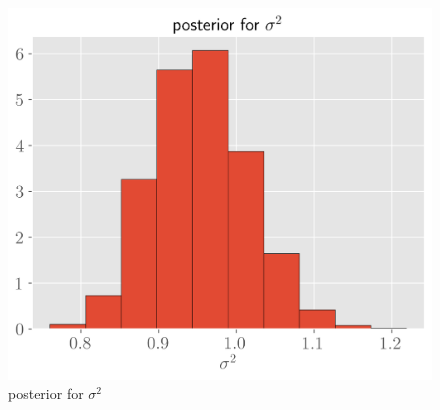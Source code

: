 \documentclass[11pt]{article}
\begin{document}
\begin{figure}[!h]
    \centering
    \includegraphics[scale=.6
    ]{../notebooks/sig.png}
    \caption{posterior for $\sigma^2$}
    \label{fig:my_label}
\end{figure}
\end{document}
